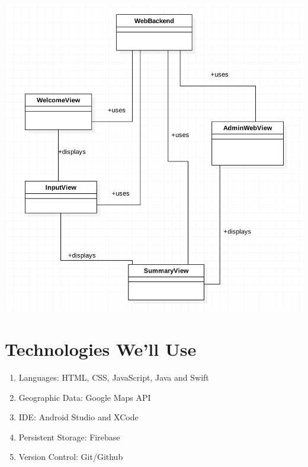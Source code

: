 \documentclass[12pt]{article}
\begin{document}
	\includegraphics[scale=0.45]{Harvest.png}
	\newpage
	
	\section{Technologies We'll Use}
	\begin{enumerate}
	\item Languages: HTML, CSS, JavaScript, Java and Swift
	\item Geographic Data: Google Maps API
	\item IDE: Android Studio and XCode
	\item Persistent Storage: Firebase
	\item Version Control: Git/Github
	\end{enumerate}
	
\end{document}
